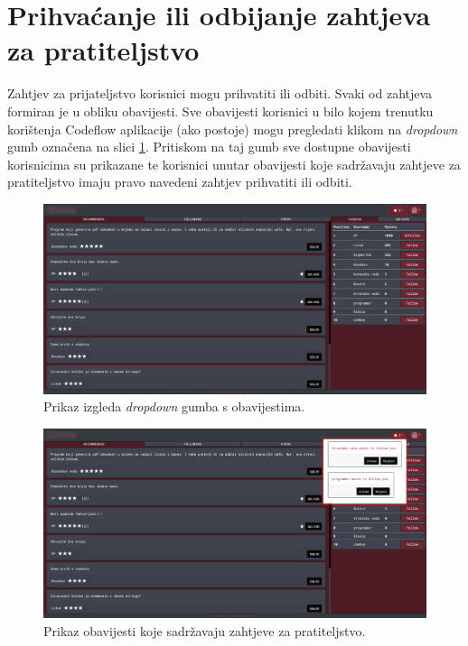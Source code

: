 \documentclass[times, utf8, zavrsni]{fer}
\begin{document}
		\section{Prihvaćanje ili odbijanje zahtjeva za pratiteljstvo}
		Zahtjev za prijateljstvo korisnici mogu prihvatiti ili odbiti. Svaki od zahtjeva formiran je u obliku obavijesti. Sve obavijesti korisnici u bilo kojem trenutku korištenja Codeflow aplikacije (ako postoje) mogu pregledati klikom na \textit{dropdown} gumb označena na slici \ref{fig:notificationbutton}. Pritiskom na taj gumb sve dostupne obavijesti korisnicima su prikazane te korisnici unutar obavijesti koje sadržavaju zahtjeve za pratiteljstvo imaju pravo navedeni zahtjev prihvatiti ili odbiti.
		\begin{figure}[htb]
			\centering
			\includegraphics[width=\linewidth]{pictures/koristenje/GumbZaObavijesti.png}
			\caption{Prikaz izgleda \textit{dropdown} gumba s obavijestima.}
			\label{fig:notificationbutton}
		\end{figure}
		\begin{figure}[htb]
			\centering
			\includegraphics[width=\linewidth]{pictures/koristenje/ZahtjevObavijesti.png}
			\caption{Prikaz obavijesti koje sadržavaju zahtjeve za pratiteljstvo.}
			\label{fig:pratiteljstvo}
		\end{figure}
	
\end{document}
